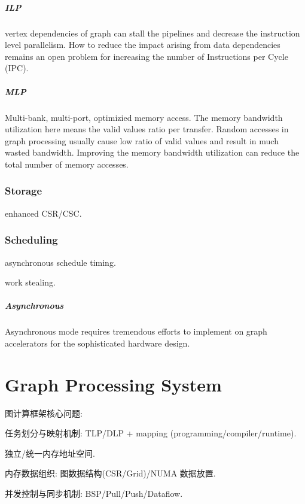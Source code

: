 \documentclass[UTF8,12pt,a4paper]{article}
\begin{document}
\subparagraph{ILP}
vertex dependencies of graph can stall the pipelines
and decrease the instruction level parallelism.
How to reduce the impact arising from data dependencies
remains an open problem for increasing the number of Instructions per Cycle (IPC).

\subparagraph{MLP}
Multi-bank, multi-port, optimizied memory access.
The memory bandwidth utilization here means
the valid values ratio per transfer.
Random accesses in graph processing usually cause
low ratio of valid values and result in much wasted bandwidth.
Improving the memory bandwidth utilization can reduce the total number of memory accesses.

\subsubsection{Storage}
\begin{compactitem}
  \item enhanced CSR/CSC.
\end{compactitem}
\subsubsection{Scheduling}
\begin{compactitem}
  \item asynchronous schedule timing.
  \item work stealing.
\end{compactitem}

\subparagraph{Asynchronous}
Asynchronous mode requires tremendous efforts
to implement on graph accelerators for the sophisticated hardware design.
\clearpage

\section{Graph Processing System}
图计算框架核心问题:
\begin{compactitem}
  \item 任务划分与映射机制: TLP/DLP + mapping (programming/compiler/runtime).
  \item 独立/统一内存地址空间.
  \item 内存数据组织: 图数据结构(CSR/Grid)/NUMA 数据放置.
  \item 并发控制与同步机制: BSP/Pull/Push/Dataflow.
\end{compactitem}
\end{document}
